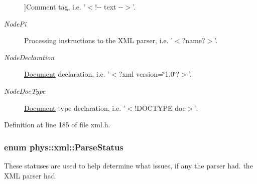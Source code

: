 \begin{Desc}
\begin{description}
{}]Comment tag, i.e. '$<$!-\/-\/ text -\/-\/$>$'. \item[{\em 
\hypertarget{namespacephys_1_1xml_a668b0cc666a9d49f7c7222a7552115d3a3c09d11be0cea840f23f55e084cf72fa}{
NodePi}
\label{d9/d27/namespacephys_1_1xml_a668b0cc666a9d49f7c7222a7552115d3a3c09d11be0cea840f23f55e084cf72fa}
}]Processing instructions to the XML parser, i.e. '$<$?name?$>$'. \item[{\em 
\hypertarget{namespacephys_1_1xml_a668b0cc666a9d49f7c7222a7552115d3a1e3789aa995b7bf563ca8c43553ac035}{
NodeDeclaration}
\label{d9/d27/namespacephys_1_1xml_a668b0cc666a9d49f7c7222a7552115d3a1e3789aa995b7bf563ca8c43553ac035}
}]\hyperlink{classphys_1_1xml_1_1Document}{Document} declaration, i.e. '$<$?xml version=\char`\"{}1.0\char`\"{}?$>$'. \item[{\em 
\hypertarget{namespacephys_1_1xml_a668b0cc666a9d49f7c7222a7552115d3aca750034b7e4a34d53cfd3399b2bcd99}{
NodeDocType}
\label{d9/d27/namespacephys_1_1xml_a668b0cc666a9d49f7c7222a7552115d3aca750034b7e4a34d53cfd3399b2bcd99}
}]\hyperlink{classphys_1_1xml_1_1Document}{Document} type declaration, i.e. '$<$!DOCTYPE doc$>$'. \end{description}
\end{Desc}



Definition at line 185 of file xml.h.

\hypertarget{namespacephys_1_1xml_ae7aabb879b21c73d8183a54470f8917f}{
\subsubsection[{ParseStatus}]{\setlength{\rightskip}{0pt plus 5cm}enum {\bf phys::xml::ParseStatus}}}
\label{d9/d27/namespacephys_1_1xml_ae7aabb879b21c73d8183a54470f8917f}


These statuses are used to help determine what issues, if any the parser had. the XML parser had. 

